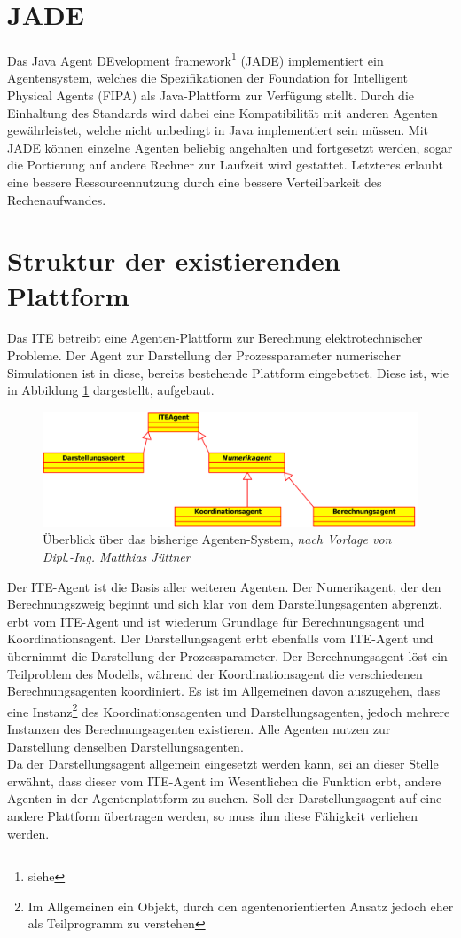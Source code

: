 \documentclass[a4paper,12pt,oneside,openright,onecolumn,final,titlepage,fleqn,ngerman]{scrreprt}
\newcommand{\parag}{\\[2ex]}
\newcommand{\calcag}{Berechnungsagent}
\newcommand{\coordag}{Koordinationsagent}
\newcommand{\repag}{Darstellungsagent}
\newcommand{\numag}{Numerikagent}
\newcommand{\iteag}{ITE-Agent}
\begin{document}
	\section{JADE}\label{kap_jade}
	Das Java Agent DEvelopment framework\footnote{siehe } (JADE) implementiert ein Agentensystem, welches die Spezifikationen der Foundation for Intelligent Physical Agents (FIPA) als Java-Plattform zur Verfügung stellt. Durch die Einhaltung des Standards wird dabei eine Kompatibilität mit anderen Agenten gewährleistet, welche nicht unbedingt in Java implementiert sein müssen. Mit JADE können einzelne Agenten beliebig angehalten und fortgesetzt werden, sogar die Portierung auf andere Rechner zur Laufzeit wird gestattet. Letzteres erlaubt eine bessere Ressourcennutzung durch eine bessere Verteilbarkeit des Rechenaufwandes.

	\section{Struktur der existierenden Plattform}\label{kap_existingPlatform}
	Das ITE betreibt eine Agenten-Plattform zur Berechnung elektrotechnischer Probleme. Der Agent zur Darstellung der Prozessparameter numerischer Simulationen ist in diese, bereits bestehende Plattform eingebettet. Diese ist, wie in Abbildung \ref{overview} dargestellt, aufgebaut.
	\begin{figure}[ht]
		\centering
		\includegraphics[keepaspectratio=true,width=\textwidth]{res/overview.png}
		\caption[Überblick über das bisherige Agenten-System]{Überblick über das bisherige Agenten-System, \emph{nach Vorlage von Dipl.-Ing. Matthias Jüttner}}
		\label{overview}
	\end{figure}
	
	Der \iteag{} ist die Basis aller weiteren Agenten. Der \numag{}, der den Berechnungszweig beginnt und sich klar von dem \repag{}en abgrenzt, erbt vom \iteag{} und ist wiederum Grundlage für \calcag{} und \coordag{}. Der \repag{} erbt ebenfalls vom \iteag{} und übernimmt die Darstellung der Prozessparameter. Der \calcag{} löst ein Teilproblem des Modells, während der \coordag{} die verschiedenen \calcag{}en koordiniert. Es ist im Allgemeinen davon auszugehen, dass eine Instanz\footnote{Im Allgemeinen ein Objekt, durch den agentenorientierten Ansatz jedoch eher als Teilprogramm zu verstehen} des \coordag{}en und \repag{}en, jedoch mehrere Instanzen des \calcag{}en existieren. Alle Agenten nutzen zur Darstellung denselben \repag{}en.\parag{}
	Da der \repag{} allgemein eingesetzt werden kann, sei an dieser Stelle erwähnt, dass dieser vom \iteag{} im Wesentlichen die Funktion erbt, andere Agenten in der Agentenplattform zu suchen. Soll der \repag{} auf eine andere Plattform übertragen werden, so muss ihm diese Fähigkeit verliehen werden.
	
\end{document}
